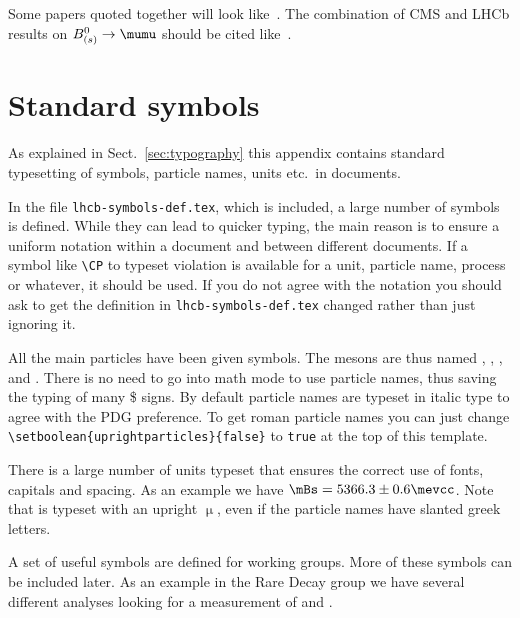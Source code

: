 Some \lhcb papers quoted together will look
like~\cite{LHCb-PAPER-2011-007,LHCb-PAPER-2011-006,
  LHCb-PAPER-2011-005,LHCb-PAPER-2011-004,LHCb-PAPER-2011-003}.
The combination of CMS and LHCb results on $B^0_{(s)} \to \mumu$ should be cited like~\cite{LHCb-CONF-2013-012}.

\section{Standard symbols}

As explained in Sect.~\ref{sec:typography} this appendix contains standard
typesetting of symbols, particle names, units etc.\ in \lhcb
documents. 

In the file \texttt{lhcb-symbols-def.tex}, which is included, a
large number of symbols is defined. While they can lead to quicker
typing, the main reason is to ensure a uniform notation within a
document and between different \lhcb documents. If a symbol
like \texttt{\textbackslash CP} to typeset \CP violation is available
for a unit, particle name, process or whatever, it should be used.  If
you do not agree with the notation you should ask to get the
definition in \texttt{lhcb-symbols-def.tex} changed rather than just
ignoring it.

All the main particles have been given symbols. The \B mesons are thus
named \Bp, \Bd, \Bs, and \Bc. There is no need to go into math mode to
use particle names, thus saving the typing of many \$ signs. By
default particle names are typeset in italic type to agree with the
PDG preference. To get roman particle
names you can just change 
\texttt{\textbackslash setboolean\{uprightparticles\}\{false\}}
to \texttt{true} at the top of this template.

There is a large number of units typeset that ensures the correct use
of fonts, capitals and spacing. As an example we have
$\mBs=5366.3\pm0.6\mevcc$. Note that \mum is typeset with an upright
$\upmu$, even if the particle names have slanted greek letters.

A set of useful symbols are defined for working groups. More of these
symbols can be included later. As an example in the Rare Decay group
we have several different analyses looking for a measurement of
 and .



